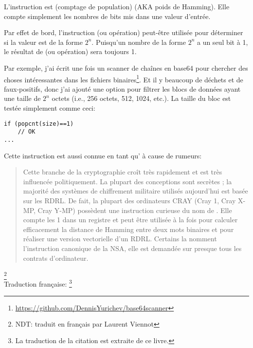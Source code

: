 \label{POPCNT}

L'instruction  est  (comptage de population) (\ac{AKA}
poids de Hamming). Elle compte simplement les nombres de bits mis dans une valeur
d'entrée.

Par effet de bord, l'instruction  (ou opération) peut-être utilisée pour
déterminer si la valeur est de la forme $2^n$. Puisqu'un nombre de la forme $2^n$
a un seul bit à 1, le résultat de  (ou opération) sera toujours 1.

Par exemple, j'ai écrit une fois un scanner de chaînes en base64 pour chercher des
choses intéressantes dans les fichiers binaires\footnote{\url{https://github.com/DennisYurichev/base64scanner}}.
Et il y  beaucoup de déchets et de faux-positifs, donc j'ai ajouté une option pour
filtrer les blocs de données ayant une taille de $2^n$ octets (i.e., 256 octets,
512, 1024, etc.).
La taille du bloc est testée simplement comme ceci:

\begin{lstlisting}[style=customc]
if (popcnt(size)==1)
	// OK
...
\end{lstlisting}

Cette instruction est aussi connue en tant qu' à cause de
rumeurs:

\begin{framed}
\begin{quotation}
Cette branche de la cryptographie croît très rapidement et est très influencée politiquement.
La plupart des conceptions sont secrètes ; la majorité des systèmes de chiffrement
militaire utilisés aujourd'hui est basée sur les RDRL. De fait, la plupart des ordinateurs
CRAY (Cray 1, Cray X-MP, Cray Y-MP) possèdent une instruction curieuse du
nom de .
Elle compte les 1 dans un registre et peut être
utilisée à la fois pour calculer efficacement la distance de Hamming entre deux mots
binaires et pour réaliser une version vectorielle d'un RDRL. Certains la nomment
l'instruction canonique de la NSA, elle est demandée sur presque tous les contrats
d'ordinateur.
\end{quotation}
\end{framed}
\InSqBrackets{\Schneier{}}\footnote{NDT: traduit en français par Laurent Viennot}\\
Traduction française: \footnote{La
traduction de la citation est extraite de ce livre.}

